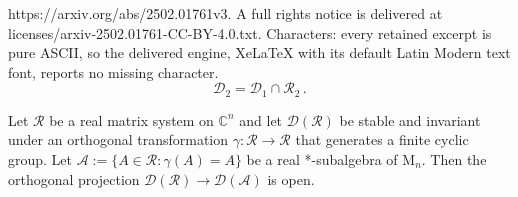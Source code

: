 \documentclass[10pt,a4paper]{amsart}
\newcommand{\C}{\mathbb{C}}
\newcommand{\M}{\mathrm{M}}
\newcommand{\cA}{\mathcal{A}}
\newcommand{\cD}{\mathcal{D}}
\newcommand{\cR}{\mathcal{R}}
\begin{document}
https://arxiv.org/abs/2502.01761v3. A full rights notice is delivered at licenses/arxiv-2502.01761-CC-BY-4.0.txt. Characters: every retained excerpt is pure ASCII, so the delivered engine, XeLaTeX with its default Latin Modern text font, reports no missing character.
\begin{equation}\label{eq:D-inter}
\cD_2=\cD_1\cap\cR_2\,.
\end{equation}

\begin{lem}\label{lem:cyclic-group}
Let $\cR$ be a real matrix system on $\C^n$ and let $\cD(\cR)$ be stable
and invariant under an orthogonal transformation $\gamma:\cR\to\cR$ that 
generates a finite cyclic group. Let $\cA:=\{A\in\cR:\gamma(A)=A\}$ be a 
real *-subalgebra of $\M_n$. Then the orthogonal projection 
$\cD(\cR)\to\cD(\cA)$ is open. 
\end{lem}
\end{document}
